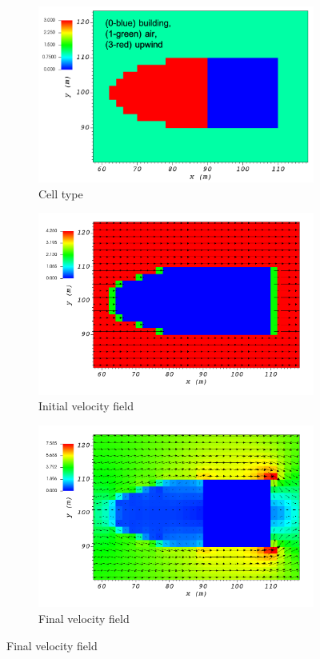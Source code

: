 \documentclass[14pt,landscape]{report}
\begin{document}
\begin{figure}[p]
    \centering
    \begin{subfigure}[t]{0.45\textwidth}
    \centering
    \includegraphics[width=10.3cm,keepaspectratio]{Images/upwind_z_5_1_init_icell.png}
    \caption{Cell type}
    \end{subfigure}
    \begin{subfigure}[t]{0.45\textwidth}
    \centering
    \includegraphics[width=11.0cm,keepaspectratio]{Images/upwind_z_5_1_init_vel.png}
    \caption{Initial velocity field}
    \end{subfigure}
    \begin{subfigure}[t]{0.45\textwidth}
    \centering
    \includegraphics[width=11.0cm,keepaspectratio]{Images/upwind_z_5_1_final.png}
    \caption{Final velocity field}
    \end{subfigure}
\end{figure}
\end{document}
